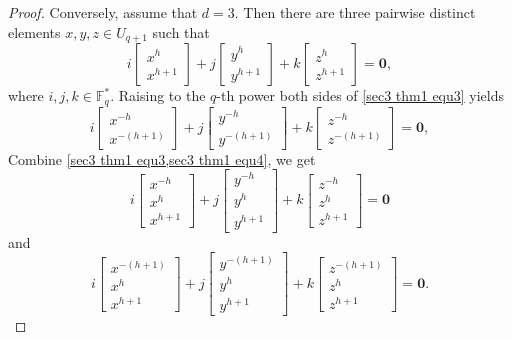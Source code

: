 \documentclass[10pt]{article}%
\begin{document}
\begin{proof}
		Conversely, assume that $d={3}$. Then there are three pairwise distinct elements $x, y, z \in U_{q+1}$ such that
		\begin{equation}
			\label{sec3 thm1 equ3}
			\left.i\left[\begin{array}{l}x^{h}\\x^{h+1}\end{array}\right.\right]+j\left[\begin{array}{l}y^{h}\\y^{h+1}\end{array}\right]+k\left[\begin{array}{l}z^{h}\\z^{h+1}\end{array}\right]=\mathbf{0},
		\end{equation}
		where $i,j,k \in \mathbb{F}_{q}^\ast$. Raising to the $q$-th power both sides of \cref{sec3 thm1 equ3} yields 
		\begin{equation}
			\label{sec3 thm1 equ4}
			\left.i\left[\begin{array}{l}x^{-h}\\x^{-(h+1)}\end{array}\right.\right]+j\left[\begin{array}{l}y^{-h}\\y^{-(h+1)}\end{array}\right]+k\left[\begin{array}{l}z^{-h}\\z^{-(h+1)}\end{array}\right]=\mathbf{0},
		\end{equation}
		Combine \cref{sec3 thm1 equ3,sec3 thm1 equ4}, we get
		\begin{equation*}
			\left.i\left[\begin{array}{l}x^{-h}\\x^h\\x^{h+1}\end{array}\right.\right]+j\left[\begin{array}{l}y^{-h}\\y^h\\y^{{h+1}}\end{array}\right]+k\left[\begin{array}{l}z^{-h}\\z^h\\z^{{h+1}}\end{array}\right]=\mathbf{0}
		\end{equation*}
		and
		\begin{equation*}
			\left.i\left[\begin{array}{l}x^{-(h+1)}\\x^h\\x^{h+1}\end{array}\right.\right]+j\left[\begin{array}{l}y^{-(h+1)}\\y^h\\y^{{h+1}}\end{array}\right]+k\left[\begin{array}{c}z^{-(h+1)}\\z^h\\z^{{h+1}}\end{array}\right]=\mathbf{0}.

\end{equation*}
\end{proof}
\end{document}
